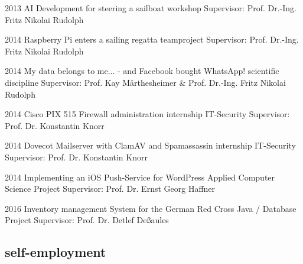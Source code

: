 \documentclass[]{friggeri-cv} %
\begin{document}
\begin{entrylist}


\entry
{2013}
{AI Development for steering a sailboat}
{workshop}
{Supervisor: Prof. Dr.-Ing. Fritz Nikolai Rudolph}


\entry
{2014}
{Raspberry Pi enters a sailing regatta}
{teamproject}
{Supervisor: Prof. Dr.-Ing. Fritz Nikolai Rudolph}


\entry
{2014}
{My data belongs to me... - and Facebook bought WhatsApp!}
{scientific discipline}
{Supervisor: Prof. Kay M\"{a}rthesheimer \& Prof. Dr.-Ing. Fritz Nikolai Rudolph}


\entry
{2014}
{Cisco PIX 515 Firewall administration}
{internship IT-Security}
{Supervisor: Prof. Dr. Konstantin Knorr}


\entry
{2014}
{Dovecot Mailserver with ClamAV and Spamassassin}
{internship IT-Security}
{Supervisor: Prof. Dr. Konstantin Knorr}


\entry
{2014}
{Implementing an iOS Push-Service for WordPress}
{Applied Computer Science Project}
{Supervisor: Prof. Dr. Ernst Georg Haffner}


\entry
{2016}
{Inventory management System for the German Red Cross }
{Java / Database Project}
{Supervisor: Prof. Dr. Detlef Deßaules}


\end{entrylist}

\subsection{self-employment}
\end{document}
